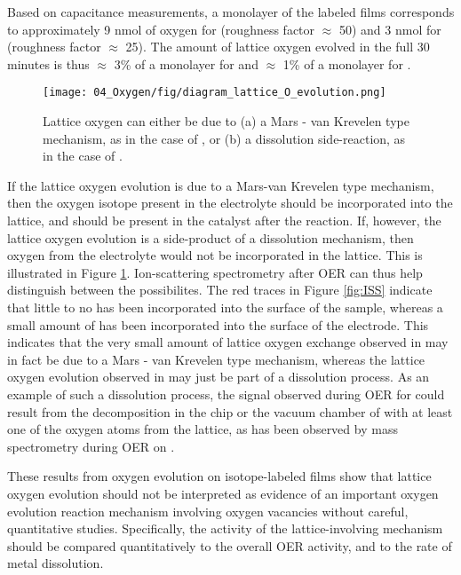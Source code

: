 Based on capacitance measurements, a monolayer of the labeled films corresponds to approximately 9 nmol of oxygen for  (roughness factor $\approx$ 50) and 3 nmol for  (roughness factor $\approx$ 25). The amount of lattice oxygen evolved in the full 30 minutes is thus $\approx$ 3\% of a monolayer for  and $\approx$ 1\% of a monolayer for .

\begin{figure}[h!]
	\texttt{[image: 04\_Oxygen/fig/diagram\_lattice\_O\_evolution.png]}
	\caption{Lattice oxygen can either be due to (a) a Mars - van Krevelen type mechanism, as in the case of , or (b) a dissolution side-reaction, as in the case of .}
	\label{fig:exchange_diagram}
\end{figure}

If the lattice oxygen evolution is due to a Mars-van Krevelen type mechanism, then the oxygen isotope present in the electrolyte should be incorporated into the lattice, and should be present in the catalyst after the reaction. If, however, the lattice oxygen evolution is a side-product of a dissolution mechanism, then oxygen from the electrolyte would not be incorporated in the lattice. This is illustrated in Figure \ref{fig:exchange_diagram}. Ion-scattering spectrometry after OER can thus help distinguish between the possibilites. The red traces in Figure \ref{fig:ISS} indicate that little to no  has been incorporated into the surface of the  sample, whereas a small amount of  has been incorporated into the surface of the  electrode. This indicates that the very small amount of lattice oxygen exchange observed in  may in fact be due to a Mars - van Krevelen type mechanism, whereas the lattice oxygen evolution observed in  may just be part of a dissolution process. As an example of such a dissolution process, the  signal observed during OER for  could result from the decomposition in the chip or the vacuum chamber of  with at least one of the oxygen atoms from the lattice, as  has been observed by mass spectrometry during OER on .\cite{Geiger2018} 

These results from oxygen evolution on isotope-labeled films show that lattice oxygen evolution should not be interpreted as evidence of an important oxygen evolution reaction mechanism involving oxygen vacancies without careful, quantitative studies. Specifically, the activity of the lattice-involving mechanism should be compared quantitatively to the overall OER activity, and to the rate of metal dissolution. 

